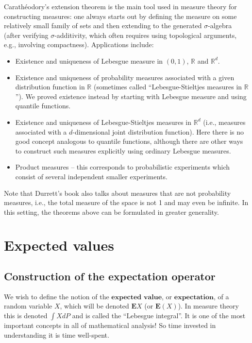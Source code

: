 \documentclass[11pt]{report}
\newcommand{\R}{\mathbb{R}}
\theoremstyle{plain}
\theoremstyle{definition}
\begin{document}
\noindent Carathéodory's extension theorem is the main tool
used in measure theory for constructing measures: one
always starts out by defining the measure on some
relatively small family of sets and then extending to
the generated $\sigma$-algebra (after verifying
$\sigma$-additivity, which often requires using
topological arguments, e.g., involving compactness).
Applications include:

\begin{itemize}
\item Existence and uniqueness of Lebesgue measure in
$(0,1)$, $\R$ and $\R^d$.

\item Existence and uniqueness of probability measures
associated with a given distribution function in $\R$
(sometimes called ``Lebesgue-Stieltjes measures in
$\R$''). We proved existence instead by starting with
Lebesgue measure and using quantile functions.

\item Existence and uniqueness of Lebesgue-Stieltjes
measures in $\R^d$ (i.e., measures associated with a
$d$-dimensional joint distribution function). Here
there is no good concept analogous to quantile
functions, although there are other ways to construct
such measures explicitly using ordinary Lebesgue
measures.

\item Product measures -- this corresponds to probabilistic
experiments which consist of several independent
smaller experiments.
\end{itemize}

\noindent Note that Durrett's book also talks about measures
that are not probability measures, i.e., the total
measure of the space is not 1 and may even be
infinite. In this setting, the theorems above can be
formulated in greater generality.

\chapter{Expected values}

\section{Construction of the expectation operator}

We wish to define the notion of the
$\textbf{expected value}$, or $\textbf{expectation}$,
of a random variable $X$, which will be denoted
$\mathbf{E} X$ (or $\mathbf{E}(X)$). In measure
theory this is denoted $\int X dP$ and is called the
``Lebesgue integral''. It is one of the most important
concepts in all of mathematical analysis! So time
invested in understanding it is time well-spent.
\end{document}
